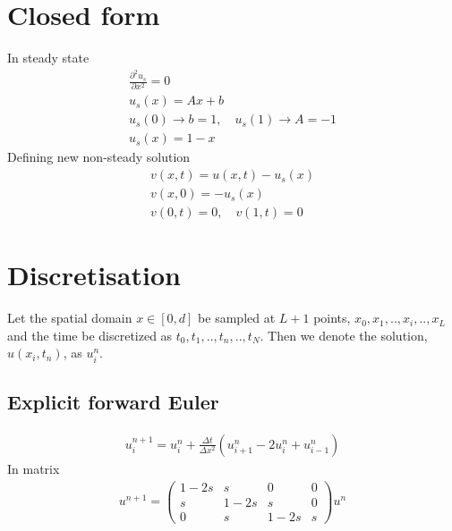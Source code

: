 \documentclass[11pt,a4paper,draft]{article}
\numberwithin{equation}{section}
\begin{document}
\section{Closed form}
In steady state
\begin{gather}
\frac{\partial^2 u_s}{\partial x^2} = 0\\
u_s(x) = Ax + b\\
u_s(0) \to b = 1, \quad
u_s(1) \to A = -1\\
u_s(x) = 1-x
\end{gather}
Defining new non-steady solution
\begin{gather}
v(x,t) = u(x,t) - u_s(x)\\
v(x,0) = -u_s(x)\\
v(0,t) = 0, \quad v(1, t) = 0
\end{gather}


\section{Discretisation}

Let the spatial domain $x \in [0,d]$ be sampled at $L+1$ points, $x_0,x_1,..,x_i,..,x_L$ and the time be discretized as $t_0,t_1,..,t_n,..,t_N$. Then we denote the solution, $u(x_i,t_n)$, as $u_i^n$.  

\subsection{Explicit forward Euler}

\begin{gather}
u_i^{n+1} = u_i^n + \frac{\Delta t}{\Delta x^2}\left(
u_{i+1}^n - 2u_i^n + u_{i-1}^n
\right)
\end{gather}
In matrix
\begin{gather}
u^{n+1} = 
\begin{pmatrix}
1 - 2s & s & 0 & 0\\
s & 1 - 2s & s & 0\\
0 & s & 1-2s & s
\end{pmatrix}u^n
\end{gather}
\end{document}

